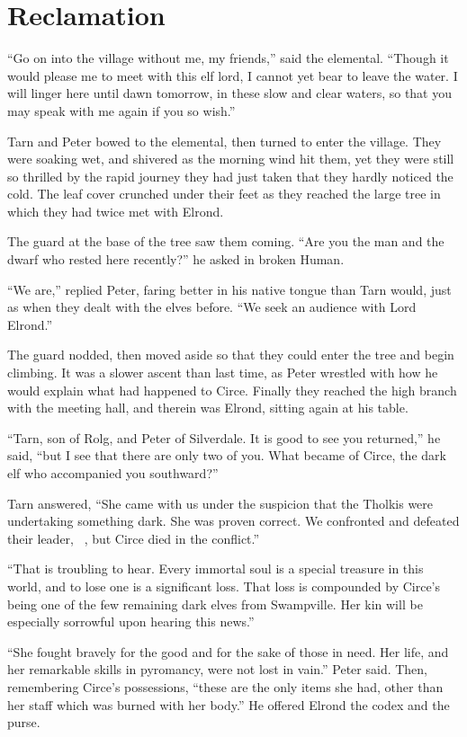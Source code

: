 \chapter{Reclamation}
``Go on into the village without me, my friends,'' said the elemental.  ``Though it would please me to meet with this elf lord, I cannot yet bear to leave the water.  I will linger here until dawn tomorrow, in these slow and clear waters, so that you may speak with me again if you so wish.''

Tarn and Peter bowed to the elemental, then turned to enter the village.   They were soaking wet, and shivered as the morning wind hit them, yet they were still so thrilled by the rapid journey they had just taken that they hardly noticed the cold.  The leaf cover crunched under their feet as they reached the large tree in which they had twice met with Elrond.

The guard at the base of the tree saw them coming.  ``Are you the man and the dwarf who rested here recently?'' he asked in broken Human.

``We are,'' replied Peter, faring better in his native tongue than Tarn would, just as when they dealt with the elves before.  ``We seek an audience with Lord Elrond.''

The guard nodded, then moved aside so that they could enter the tree and begin climbing.  It was a slower ascent than last time, as Peter wrestled with how he would explain what had happened to Circe.  Finally they reached the high branch with the meeting hall, and therein was Elrond, sitting again at his table.

``Tarn, son of Rolg, and Peter of Silverdale.  It is good to see you returned,'' he said, ``but I see that there are only two of you.  What became of Circe, the dark elf who accompanied you southward?''

Tarn answered, ``She came with us under the suspicion that the Tholkis were undertaking something dark.  She was proven correct.  We confronted and defeated their leader, \mothzam\ \driktur, but Circe died in the conflict.''

``That is troubling to hear.  Every immortal soul is a special treasure in this world, and to lose one is a significant loss.  That loss is compounded by Circe's being one of the few remaining dark elves from Swampville.  Her kin will be especially sorrowful upon hearing this news.''

``She fought bravely for the good and for the sake of those in need.  Her life, and her remarkable skills in pyromancy, were not lost in vain.'' Peter said.  Then, remembering Circe's possessions, ``these are the only items she had, other than her staff which was burned with her body.''  He offered Elrond the codex and the purse.

